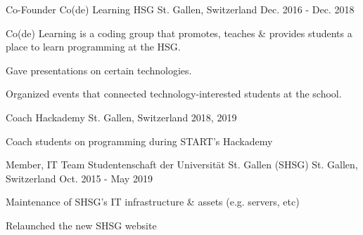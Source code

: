 

\begin{cventries}

  \cventry
    {Co-Founder} %
    {Co(de) Learning HSG} %
    {St. Gallen, Switzerland} %
    {Dec. 2016 - Dec. 2018} %
    {} %
    {
      \begin{cvitems} %
        \item {Co(de) Learning is a coding group that promotes, teaches \& provides students a place to learn programming at the HSG.}
        \item {Gave presentations on certain technologies.}
        \item {Organized events that connected technology-interested students at the school.}
      \end{cvitems}
    }

    \cventry
      {Coach} %
      {Hackademy} %
      {St. Gallen, Switzerland} %
      {2018, 2019} %
      {} %
      {
        \begin{cvitems} %
          \item {Coach students on programming during START's Hackademy}
        \end{cvitems}
      }

  \cventry
    {Member, IT Team} %
    {Studentenschaft der Universität St. Gallen (SHSG)} %
    {St. Gallen, Switzerland} %
    {Oct. 2015 - May 2019} %
    {} %
    {
      \begin{cvitems} %
        \item {Maintenance of SHSG's IT infrastructure \& assets (e.g. servers, etc)}
        \item {Relaunched the new SHSG website}
      \end{cvitems}
    }


\end{cventries}
